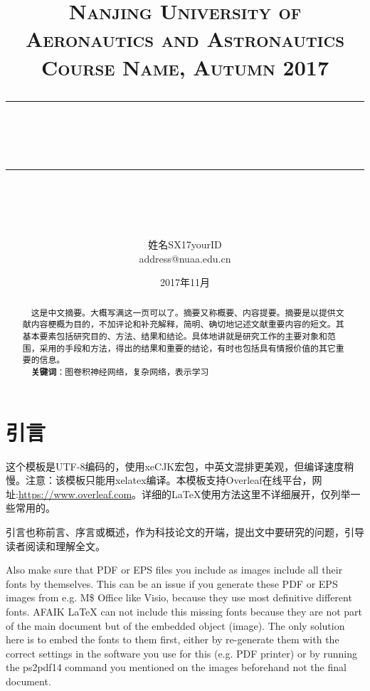 \documentclass[12pt]{article} %
\newcommand{\horrule}[1]{\rule[0.5ex]{\linewidth}{#1}} 	%
\begin{document}
\title{
{\normalfont\normalsize\textsc{
Nanjing University of Aeronautics and Astronautics\\
Course Name, Autumn 2017 \\[25pt]}}
\horrule{0.5pt}\\
\horrule{1.8pt}\\[20pt]
}
\author{姓名\quad SX17yourID\\address@nuaa.edu.cn}
\date{2017年11月} %

\begin{titlepage}
\maketitle
\vspace{30pt}
\begin{abstract}
\normalsize \ \ 这是中文摘要。大概写满这一页可以了。摘要又称概要、内容提要。摘要是以提供文献内容梗概为目的，不加评论和补充解释，简明、确切地记述文献重要内容的短文。其基本要素包括研究目的、方法、结果和结论。具体地讲就是研究工作的主要对象和范围，采用的手段和方法，得出的结果和重要的结论，有时也包括具有情报价值的其它重要的信息。\\[5pt]
\indent \ \ \textbf{关键词}：图卷积神经网络，复杂网络，表示学习
\end{abstract}
\thispagestyle{empty}
\end{titlepage}

{\hypersetup{linkcolor=black}
\tableofcontents
}
\thispagestyle{empty}

\newpage
\setcounter{page}{1}

\section{引言}
这个模板是UTF-8编码的，使用xeCJK宏包，中英文混排更美观，但编译速度稍慢。注意：该模板只能用xelatex编译。本模板支持Overleaf在线\LaTeXe 平台，网址:\url{https://www.overleaf.com}。详细的\LaTeX 使用方法这里不详细展开，仅列举一些常用的。

引言也称前言、序言或概述，作为科技论文的开端，提出文中要研究的问题，引导读者阅读和理解全文。

Also make sure that PDF or EPS files you include as images include all their fonts by themselves. This can be an issue if you generate these PDF or EPS images from e.g. M\$ Office like Visio, because they use most definitive different fonts. AFAIK LaTeX can not include this missing fonts because they are not part of the main document but of the embedded object (image). The only solution here is to embed the fonts to them first, either by re-generate them with the correct settings in the software you use for this (e.g. PDF printer) or by running the ps2pdf14 command you mentioned on the images beforehand not the final document.
\end{document}
